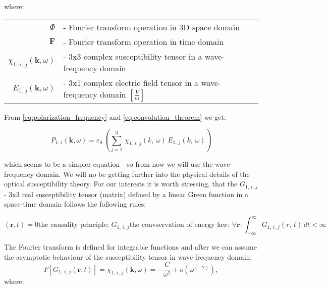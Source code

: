 \documentclass[12pt,twoside,a4paper]{article}
\def\emptyline{\vspace{12pt}}
\numberwithin{equation}{subsection}
\numberwithin{figure}{subsection}
\begin{document}
where: 

\begin{tabular}{r l}
  $\Phi $ & - Fourier transform operation in $3$D space domain \\
  $\textbf{F}$ & - Fourier transform operation in time domain \\
  ${\chi_{1, \,i, \,j}} (\textbf{k},\omega) $ & - 3x3 complex susceptibility tensor in a wave-frequency domain
  \cite{fakiszscan} \\ ${E_{1, \,j}} (\textbf{k}, \omega) $ & - 3x1 complex electric field tensor in a wave-frequency
  domain $[\frac {V}{m}]$ \\
\end{tabular}


\emptyline


From \ref{eq:polarization_frequency} and \ref{eq:convolution_theorem} we get:

\begin{equation} \label{eq:final_linpolarization}
  {P_{1, \,i}}  (\textbf{k}, \omega) = {\varepsilon_{0}}\,(\sum_{j=1}^{3}\,{\chi_{1, \,i, \,j}}(k,\,\omega )\,{E_{1, \,j}}(k, \,\omega ))
\end{equation}

which seems to be a simpler equation - so from now we will use the wave-frequency domain. We will no be getting further into the physical
details of the optical susceptibility theory. For our interests it is worth stressing, that the ${G_{1, \,i, \,j}}$  - 3x3 real susceptibility
tensor (matrix) defined by a linear Green function in a space-time domain follows the following rules:

\begin{subequations}  \label{eq:green_properties}
 \begin{equation}  \label{eq:green_causality} (\textbf{r}, t) = 0
   \mbox{the causality principle: } {G_{1, \,i, \,j}}
  \end{equation}
  \begin{equation} \label{eq:green_energy}
    \mbox{the convservation of energy law: }  \forall \textbf{r} : \int_{ - \infty }^{\infty }{G_{1, \,i, \,j}}(r, \,t)\,dt <  \infty
  \end{equation}
\end{subequations}

The Fourier transform is defined for integrable functions and after \cite{muhoray_course,lucarini_kramers} we can assume the asymptotic
behaviour of the susceptibility tensor in wave-frequency domain:
\begin{equation} \label{eq:susceptibility_wavefrequency}
  F[ G_{1, \,i, \,j} (\textbf{r} ,t) ] = \chi_{1, \,i, \,j} (\textbf{k}, \omega ) = - \frac {C}{\omega ^{2}} + o(\omega ^{( - 2)}),
\end{equation}
where: 
\end{document}
